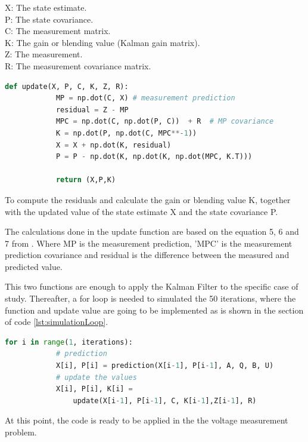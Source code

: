 \documentclass{article}
\begin{document}
    X: The state estimate. \\
    P: The state covariance. \\
    C: The measurement matrix. \\
    K: The gain or blending value (Kalman gain matrix).\\
    Z: The measurement. \\
    R: The measurement covariance matrix. \\

    \begin{lstlisting}[language=Python, caption= Update Kalman function, label={lst:update}]
        def update(X, P, C, K, Z, R):
            MP = np.dot(C, X) # measurement prediction
            residual = Z - MP 
            MPC = np.dot(C, np.dot(P, C))  + R  # MP covariance
            K = np.dot(P, np.dot(C, MPC**-1)) 
            X = X + np.dot(K, residual) 
            P = P - np.dot(K, np.dot(K, np.dot(MPC, K.T))) 
    
            return (X,P,K) 
    \end{lstlisting}

    To compute the residuals and calculate the gain or blending value K, together with the updated value of the state estimate X and the
    state covariance P. 

    The calculations done in the update function are based on the equation 5, 6 and 7 from \cite{LabManual}. Where MP is the measurement prediction, 'MPC' is the measurement
    prediction covariance and residual is the difference between the measured and predicted value.

    This two functions are enough to apply the Kalman Filter to the specific case of study. Thereafter, a for loop is needed to simulated the
    50 iterations, where the function and update value are going to be implemented as is shown in the section of code \ref{lst:simulationLoop}.

    \begin{lstlisting}[language=Python, caption= Simulation for n amount if iterations, label={lst:simulationLoop}]
        for i in range(1, iterations):    
            # prediction
            X[i], P[i] = prediction(X[i-1], P[i-1], A, Q, B, U)
            # update the values
            X[i], P[i], K[i] = 
                update(X[i-1], P[i-1], C, K[i-1],Z[i-1], R)
    \end{lstlisting}

    At this point, the code is ready to be applied in the the voltage measurement problem.
\end{document}
